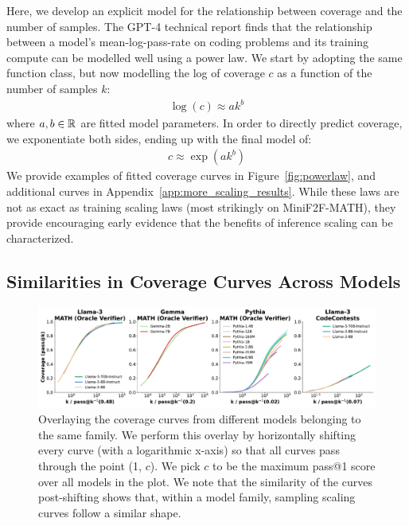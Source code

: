 \documentclass[11pt]{article}
\begin{document}
Here, we develop an explicit model for the relationship between coverage and the number of samples. The GPT-4 technical report \cite{openai2024gpt4technicalreport} finds that the relationship between a model’s mean-log-pass-rate on coding problems and its training compute can be modelled well using a power law. We start by adopting the same function class, but now modelling the log of coverage $c$ as a function of the number of samples $k$: 
\begin{align}
    \log(c) \approx a k^{b}
\end{align}
where $a,b \in \mathbb{R}$ are fitted model parameters. 
In order to directly predict coverage, we exponentiate both sides, ending up with the final model of:
\begin{align}
\label{eq:scaling_law}
    c \approx \exp(a k^{b})
\end{align}
We provide examples of fitted coverage curves in Figure~\ref{fig:powerlaw}, and additional curves in Appendix~\ref{app:more_scaling_results}. While these laws are not as exact as training scaling laws (most strikingly on MiniF2F-MATH), they provide encouraging early evidence that the benefits of inference scaling can be characterized.

\subsection{Similarities in Coverage Curves Across Models}
\label{sec:similarities}

\begin{figure}
    \centering
    \includegraphics[width=\textwidth]{figures/align.pdf}
    \caption{Overlaying the coverage curves from different models belonging to the same family. We perform this overlay by horizontally shifting every curve (with a logarithmic x-axis) so that all curves pass through the point (1, $c$). We pick $c$ to be the maximum pass@1 score over all models in the plot. We note that the similarity of the curves post-shifting shows that, within a model family, sampling scaling curves follow a similar shape.}
    \label{fig:recentering}
\end{figure}
\end{document}
